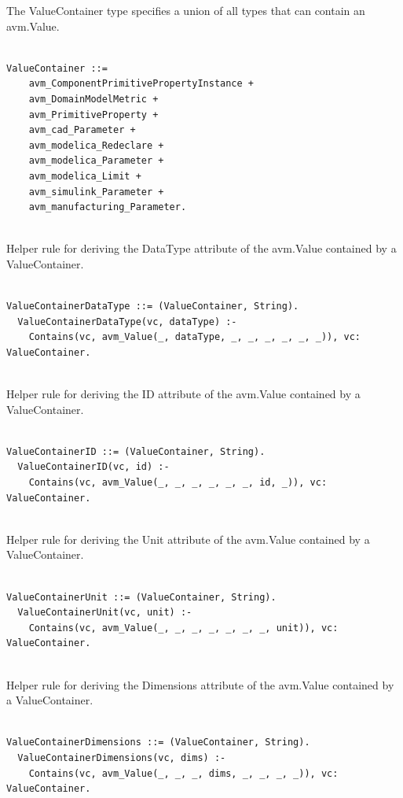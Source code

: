 The ValueContainer type specifies a union of all types that can contain an avm.Value.
\begin{lstlisting}

ValueContainer ::=
    avm_ComponentPrimitivePropertyInstance +
    avm_DomainModelMetric +
    avm_PrimitiveProperty +
    avm_cad_Parameter +
    avm_modelica_Redeclare +
    avm_modelica_Parameter +
    avm_modelica_Limit +
    avm_simulink_Parameter +
    avm_manufacturing_Parameter.


\end{lstlisting}

Helper rule for deriving the DataType attribute of the avm.Value contained by a ValueContainer.
\begin{lstlisting}

ValueContainerDataType ::= (ValueContainer, String).
  ValueContainerDataType(vc, dataType) :-
    Contains(vc, avm_Value(_, dataType, _, _, _, _, _, _)), vc: ValueContainer.


\end{lstlisting}

Helper rule for deriving the ID attribute of the avm.Value contained by a ValueContainer.
\begin{lstlisting}

ValueContainerID ::= (ValueContainer, String).
  ValueContainerID(vc, id) :-
    Contains(vc, avm_Value(_, _, _, _, _, _, id, _)), vc: ValueContainer.


\end{lstlisting}

Helper rule for deriving the Unit attribute of the avm.Value contained by a ValueContainer.
\begin{lstlisting}

ValueContainerUnit ::= (ValueContainer, String).
  ValueContainerUnit(vc, unit) :-
    Contains(vc, avm_Value(_, _, _, _, _, _, _, unit)), vc: ValueContainer.


\end{lstlisting}

Helper rule for deriving the Dimensions attribute of the avm.Value contained by a ValueContainer.
\begin{lstlisting}

ValueContainerDimensions ::= (ValueContainer, String).
  ValueContainerDimensions(vc, dims) :-
    Contains(vc, avm_Value(_, _, _, dims, _, _, _, _)), vc: ValueContainer.


\end{lstlisting}

